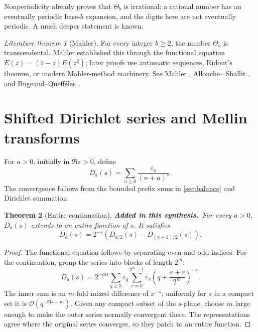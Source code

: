 \documentclass[11pt,oneside]{article}
\numberwithin{equation}{section}
\newtheorem{theorem}{Theorem}[section]
\theoremstyle{definition}
\theoremstyle{remark}
\newtheorem{literature}[theorem]{Literature theorem}
\newcommand{\eps}{\varepsilon}
\newcommand{\bigO}{\mathcal O}
\newcommand{\newmaterial}{\textcolor{AtlasBlue}{\textbf{Added in this synthesis.}}\ }
\begin{document}
Nonperiodicity already proves that \(\Theta_b\) is irrational: a rational
number has an eventually periodic base-\(b\) expansion, and the digits here
are not eventually periodic.  A much deeper statement is known.

\begin{literature}[Mahler]
For every integer \(b\ge2\), the number \(\Theta_b\) is transcendental.
Mahler established this through the functional equation
\(E(z)=(1-z)E(z^2)\); later proofs use automatic sequences, Ridout's theorem,
or modern Mahler-method machinery.  See Mahler \cite{Mahler1929}, Allouche--
Shallit \cite{AlloucheShallitBook}, and Bugeaud--Queff\'elec
\cite{BugeaudQueffelec}.
\end{literature}

\section{Shifted Dirichlet series and Mellin transforms}
\label{sec:dirichlet}

For \(a>0\), initially in \(\Re s>0\), define
\begin{equation}
 D_a(s)=\sum_{n\ge0}\frac{\eps_n}{(n+a)^s}.
 \label{eq:Da-def}
\end{equation}
The convergence follows from the bounded prefix sums in
\cref{sec:balance} and Dirichlet summation.

\begin{theorem}[Entire continuation]
\newmaterial For every \(a>0\), \(D_a(s)\) extends to an entire function of
\(s\).  It satisfies
\begin{equation}
 \boxed{D_a(s)=2^{-s}
 \left(D_{a/2}(s)-D_{(a+1)/2}(s)\right).}
 \label{eq:Da-functional}
\end{equation}
\end{theorem}

\begin{proof}
The functional equation follows by separating even and odd indices.  For the
continuation, group the series into blocks of length \(2^m\):
\begin{equation}
 D_a(s)=2^{-ms}\sum_{q\ge0}\eps_q
 \sum_{r=0}^{2^m-1}\eps_r
 \left(q+\frac{a+r}{2^m}\right)^{-s}.
 \label{eq:Da-blocked}
\end{equation}
The inner sum is an \(m\)-fold mixed difference of \(x^{-s}\); uniformly for
\(s\) in a compact set it is \(\bigO(q^{-\Re s-m})\).  Given any compact
subset of the \(s\)-plane, choose \(m\) large enough to make the outer series
normally convergent there.  The representations agree where the original
series converges, so they patch to an entire function.
\end{proof}
\end{document}
